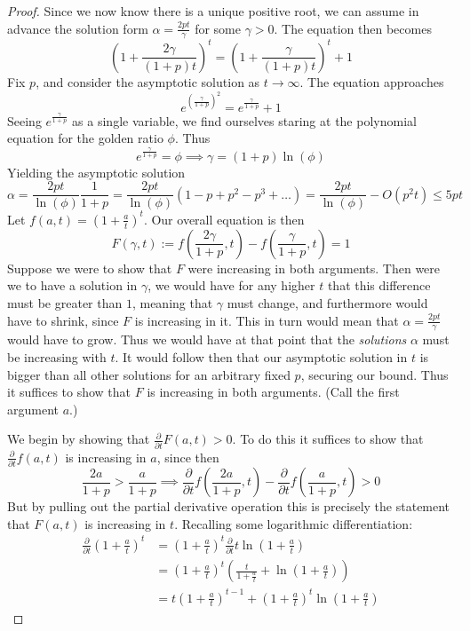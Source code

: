 \documentclass{article}
\theoremstyle{definition}
\theoremstyle{plain}
\theoremstyle{theorem}
\begin{document}
\begin{proof}
Since we now know there is a unique positive root, we can assume in advance the solution form $\alpha = \frac{2pt}{\gamma}$ for some $\gamma > 0$. The equation then becomes 
\[ \left( 1+\frac{2\gamma}{(1+p)t} \right)^t = \left( 1+\frac{\gamma}{(1+p)t} \right)^t+1 \] 
Fix $p$, and consider the asymptotic solution as $t \to \infty$. The equation approaches
\[ e^{(\frac{\gamma}{1+p})^2} = e^{\frac{\gamma}{1+p}} + 1 \] 
Seeing $e^{\frac{\gamma}{1+p}}$ as a single variable, we find ourselves staring at the polynomial equation for the golden ratio $\phi$. Thus 
\[ e^{\frac{\gamma}{1+p}} = \phi \implies \gamma = (1+p)\ln(\phi) \]
Yielding the asymptotic solution
\[ \alpha = \frac{2pt}{\ln(\phi)}\frac{1}{1+p} = \frac{2pt}{\ln(\phi)}(1-p+p^2-p^3 + \ldots) = \frac{2pt}{\ln(\phi)} - O(p^2t) \leq 5pt \]
 Let $f(a,t) = \left( 1+\frac{a}{t} \right)^t$. Our overall equation is then
 \[ F(\gamma,t) := f(\frac{2\gamma}{1+p},t) - f(\frac{\gamma}{1+p},t) = 1 \]
Suppose we were to show that $F$ were increasing in both arguments. Then were we to have a solution in $\gamma$, we would have for any higher $t$ that this difference must be greater than $1$, meaning that $\gamma$ must change, and furthermore would have to shrink, since $F$ is increasing in it. This in turn would mean that $\alpha = \frac{2pt}{\gamma}$ would have to grow. Thus we would have at that point that the \emph{solutions} $\alpha$ must be increasing with $t$. It would follow then that our asymptotic solution in $t$ is bigger than all other solutions for an arbitrary fixed $p$, securing our bound. Thus it suffices to show that $F$ is increasing in both arguments. (Call the first argument $a$.) \par 
We begin by showing that $\frac{\partial}{\partial t}F(a,t) > 0$. To do this it suffices to show that $\frac{\partial}{\partial t} f(a,t)$ is increasing in $a$, since then 
\[ \frac{2a}{1+p} > \frac{a}{1+p} \implies \frac{\partial}{\partial t}f(\frac{2a}{1+p},t) - \frac{\partial}{\partial t}f(\frac{a}{1+p},t) > 0 \]
But by pulling out the partial derivative operation this is precisely the statement that $F(a,t)$ is increasing in $t$. Recalling some logarithmic differentiation:
\begin{align*}
	\frac{\partial}{\partial t}(1+\frac{a}{t})^t &= (1+\frac{a}{t})^t\frac{\partial}{\partial t}t\ln(1+\frac{a}{t}) \\
	&= (1+\frac{a}{t})^t(\frac{t}{1+\frac{a}{t}} + \ln(1+\frac{a}{t})) \\
	&= t(1+\frac{a}{t})^{t-1} + (1+\frac{a}{t})^t\ln(1+\frac{a}{t})
\end{align*} 

\end{proof}
\end{document}
